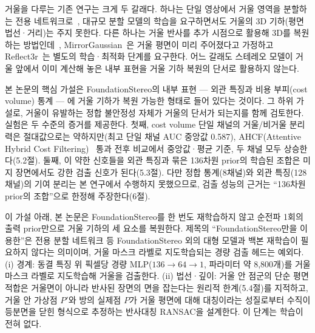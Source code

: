 \documentclass[twocolumn,10pt,a4paper]{article}
\begin{document}
거울을 다루는 기존 연구는 크게 두 갈래다. 하나는 단일 영상에서 거울 영역을 분할하는 전용 네트워크로~\cite{yang2019mirrornet,lin2020pmd}, 대규모 분할 모델의 학습을 요구하면서도 거울의 3D 기하(평면 법선·거리)는 주지 못한다. 다른 하나는 거울 반사를 추가 시점으로 활용해 3D를 복원하는 방법인데~\cite{liu2024mirrorgaussian,wu2026reflect3r}, MirrorGaussian~\cite{liu2024mirrorgaussian}은 거울 평면이 미리 주어졌다고 가정하고 Reflect3r~\cite{wu2026reflect3r}는 별도의 학습·최적화 단계를 요구한다. 어느 갈래도 스테레오 모델이 거울 앞에서 이미 계산해 놓은 내부 표현을 거울 기하 복원의 단서로 활용하지 않는다.

본 논문의 핵심 가설은 FoundationStereo의 내부 표현 --- 외관 특징과 비용 부피(cost volume) 통계 --- 에 거울 기하가 복원 가능한 형태로 들어 있다는 것이다. 그 하위 가설로, 거울이 유발하는 정합 불안정성 자체가 거울의 단서가 되는지를 함께 검토한다. 실험은 두 수준의 증거를 제공한다. 첫째, cost volume 단일 채널의 거울/비거울 분리력은 절대값으로는 약하지만(최고 단일 채널 AUC 중앙값 0.587), AHCF(Attentive Hybrid Cost Filtering)~\cite{wen2025foundationstereo} 통과 전후 비교에서 중앙값·평균 기준, 두 채널 모두 상승한다(5.2절). 둘째, 이 약한 신호들을 외관 특징과 묶은 136차원 prior의 학습된 조합은 미지 장면에서도 강한 검출 신호가 된다(5.3절). 다만 정합 통계(8채널)와 외관 특징(128채널)의 기여 분리는 본 연구에서 수행하지 못했으므로, 검출 성능의 근거는 ``136차원 prior의 조합''으로 한정해 주장한다(6절).

이 가설 아래, 본 논문은 FoundationStereo를 한 번도 재학습하지 않고 순전파 1회의 출력 prior만으로 거울 기하의 세 요소를 복원한다. 제목의 ``FoundationStereo만을 이용한''은 전용 분할 네트워크 등 FoundationStereo 외의 대형 모델과 백본 재학습이 필요하지 않다는 의미이며, 거울 마스크 라벨로 지도학습되는 경량 검출 헤드는 예외다. (i) 경계: 동결 특징 위 픽셀당 경량 MLP($136{\to}64{\to}1$, 파라미터 약 8,800개)를 거울 마스크 라벨로 지도학습해 거울을 검출한다. (ii) 법선·깊이: 거울 안 점군의 단순 평면 적합은 거울면이 아니라 반사된 장면의 면을 잡는다는 원리적 한계(5.4절)를 지적하고, 거울 안 가상점 $P'$와 방의 실제점 $P$가 거울 평면에 대해 대칭이라는 성질로부터 수직이등분면을 닫힌 형식으로 추정하는 반사대칭 RANSAC을 설계한다. 이 단계는 학습이 전혀 없다.
\end{document}
